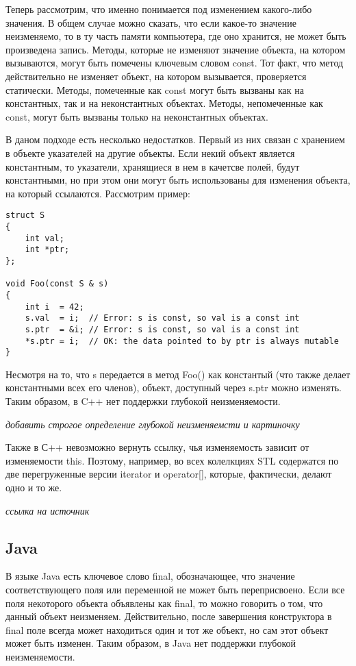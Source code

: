 Теперь рассмотрим, что именно понимается под изменением какого-либо значения. В общем случае можно сказать, что если какое-то значение неизменяемо, то в ту часть памяти компьютера, где оно хранится, не может быть произведена запись. Методы, которые не изменяют значение объекта, на котором вызываются, могут быть помечены ключевым словом const. Тот факт, что метод действительно не изменяет объект, на котором вызывается, проверяется статически. Методы, помеченные как const могут быть вызваны как на константных, так и на неконстантных объектах. Методы, непомеченные как const, могут быть вызваны только на неконстантных объектах. 

В даном подходе есть несколько недостатков. Первый из них связан с хранением в объекте указателей на другие объекты. Если некий объект является константным, то указатели, хранящиеся в нем в качетсве полей, будут константными, но при этом они могут быть использованы для изменения объекта, на который ссылаются. Рассмотрим пример: 

\begin{lstlisting}[caption=Пример изменения значения по указателю в константном методе, label=code:pointer]
struct S
{ 
    int val;
    int *ptr;
};
 
void Foo(const S & s)
{
    int i  = 42;
    s.val  = i;  // Error: s is const, so val is a const int
    s.ptr  = &i; // Error: s is const, so val is a const int
    *s.ptr = i;  // OK: the data pointed to by ptr is always mutable
}
\end{lstlisting}

Несмотря на то, что s передается в метод Foo() как константый (что также делает константными всех его членов), объект, доступный через s.ptr можно изменять. Таким образом, в C++ нет поддержки глубокой неизменяемости.

\textit{добавить строгое определение глубокой неизменяемсти и картиночку}

Также в С++ невозможно вернуть ссылку, чья изменяемость зависит от изменяемости this. Поэтому, например, во всех колелкциях STL содержатся по две перегруженные версии iterator и operator[], которые, фактически, делают одно и то же. 

\textit{ссылка на источник}

\subsection{Java}

В языке Java есть ключевое слово final, обозначающее, что значение соответствующего поля или переменной не может быть переприсвоено. Если все поля некоторого объекта объявлены как final, то можно говорить о том, что данный объект неизменяем. Действительно, после завершения конструктора в final поле всегда может находиться один и тот же объект, но сам этот объект может быть изменен. Таким образом, в Java нет поддержки глубокой неизменяемости.

